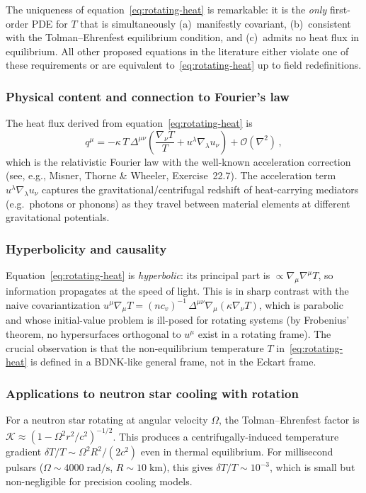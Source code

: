 The uniqueness of equation~\eqref{eq:rotating-heat} is remarkable:
it is the \emph{only} first-order PDE for $T$ that is simultaneously
(a)~manifestly covariant, (b)~consistent with the Tolman--Ehrenfest
equilibrium condition, and (c)~admits no heat flux in equilibrium.
All other proposed equations in the literature either violate one of
these requirements or are equivalent to~\eqref{eq:rotating-heat} up
to field redefinitions.

\subsubsection{Physical content and connection to Fourier's law}
The heat flux derived from equation~\eqref{eq:rotating-heat} is
\begin{equation}
  q^\mu = -\kappa\,T\,\Delta^{\mu\nu}\!
  \left(\frac{\nabla_\nu T}{T} + u^\lambda\nabla_\lambda u_\nu\right)
  + \mathcal{O}(\nabla^2)\,,
  \label{eq:rel-fourier-rotating}
\end{equation}
which is the relativistic Fourier law with the well-known acceleration
correction (see, e.g., Misner, Thorne \& Wheeler, Exercise~22.7).
The acceleration term $u^\lambda\nabla_\lambda u_\nu$ captures the
gravitational/centrifugal redshift of heat-carrying mediators
(e.g.\ photons or phonons) as they travel between material elements
at different gravitational potentials.

\subsubsection{Hyperbolicity and causality}
Equation~\eqref{eq:rotating-heat} is \emph{hyperbolic}: its principal
part is $\propto \nabla_\mu\nabla^\mu T$, so information propagates
at the speed of light.  This is in sharp contrast with the naive
covariantization $u^\mu\nabla_\mu T = (nc_v)^{-1}\,\Delta^{\mu\nu}\nabla_\mu(\kappa\nabla_\nu T)$,
which is parabolic and whose initial-value problem is ill-posed for
rotating systems (by Frobenius' theorem, no hypersurfaces orthogonal
to $u^\mu$ exist in a rotating frame).  The crucial observation is
that the non-equilibrium temperature $T$ in~\eqref{eq:rotating-heat}
is defined in a BDNK-like general frame, not in the Eckart frame.

\subsubsection{Applications to neutron star cooling with rotation}
For a neutron star rotating at angular velocity $\Omega$, the
Tolman--Ehrenfest factor is $\mathcal{K} \approx (1 - \Omega^2 r^2/c^2)^{-1/2}$.
This produces a centrifugally-induced temperature gradient
$\delta T/T \sim \Omega^2 R^2/(2c^2)$ even in thermal equilibrium.
For millisecond pulsars ($\Omega \sim 4000\;\mathrm{rad/s}$,
$R \sim 10\;\mathrm{km}$), this gives $\delta T/T \sim 10^{-3}$,
which is small but non-negligible for precision cooling models.

